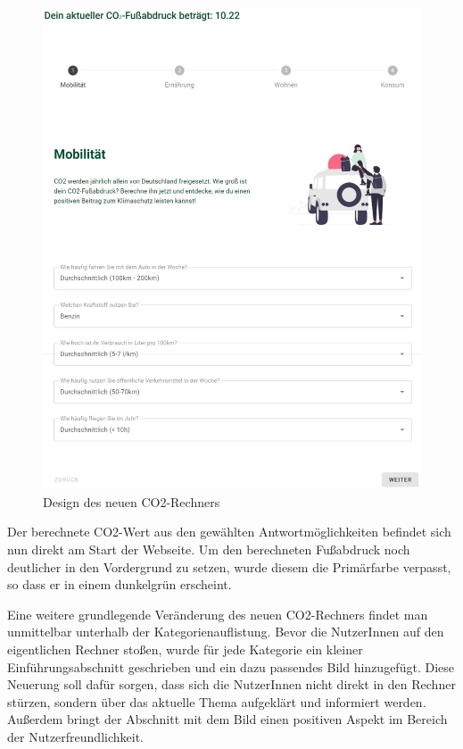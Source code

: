 \begin{figure}[H]
    \centering
    \includegraphics[width=1\textwidth]{images/06/Calculator-New-Design.jpeg}
    \caption{Design des neuen CO2-Rechners}
    \label{fig:new-co2runter-calculator-design}
\end{figure}

Der berechnete CO2-Wert aus den gewählten Antwortmöglichkeiten befindet sich nun direkt am Start der Webseite.
Um den berechneten Fußabdruck noch deutlicher in den Vordergrund zu setzen, wurde diesem die Primärfarbe verpasst, so dass er in einem dunkelgrün erscheint.

Eine weitere grundlegende Veränderung des neuen CO2-Rechners findet man unmittelbar unterhalb der Kategorienauflistung.
Bevor die NutzerInnen auf den eigentlichen Rechner stoßen, wurde für jede Kategorie ein kleiner Einführungsabschnitt geschrieben und ein dazu passendes Bild hinzugefügt.
Diese Neuerung soll dafür sorgen, dass sich die NutzerInnen nicht direkt in den Rechner stürzen, sondern über das aktuelle Thema aufgeklärt und informiert werden.
Außerdem bringt der Abschnitt mit dem Bild einen positiven Aspekt im Bereich der Nutzerfreundlichkeit.

